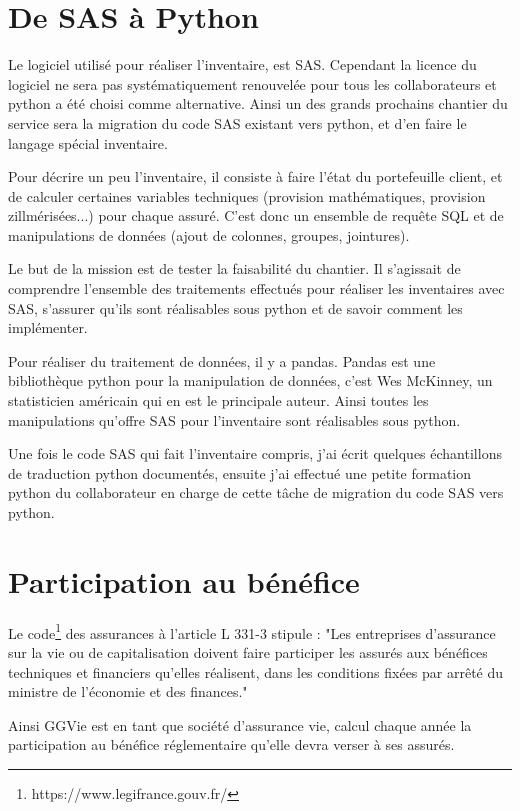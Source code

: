 \chapter{De SAS à Python}

Le logiciel utilisé pour réaliser l'inventaire, est SAS. Cependant la licence du logiciel ne sera pas systématiquement renouvelée pour tous les collaborateurs et python a été choisi comme alternative. Ainsi un des grands prochains chantier du service sera la migration du code SAS existant vers python, et d'en faire le langage spécial inventaire.

Pour décrire un peu l'inventaire, il consiste à faire l'état du portefeuille client, et de calculer certaines variables techniques (provision mathématiques, provision zillmérisées...) pour chaque assuré. C'est donc un ensemble de requête SQL et de manipulations de données (ajout de colonnes, groupes, jointures).

Le but de la mission est de tester la faisabilité du chantier. Il s’agissait de comprendre l’ensemble des traitements effectués pour réaliser les inventaires avec SAS, s'assurer qu'ils sont réalisables sous python et de savoir comment les implémenter. 

Pour réaliser du traitement de données, il y a pandas. Pandas est une bibliothèque python pour la manipulation de données, c'est Wes McKinney, un statisticien américain qui en est le principale auteur. Ainsi toutes les manipulations qu'offre SAS pour l'inventaire sont réalisables sous python.

Une fois le code SAS qui fait l'inventaire compris, j'ai écrit quelques échantillons de traduction python documentés, ensuite j'ai effectué une petite formation python du collaborateur en charge de cette tâche de migration du code SAS vers python.

\chapter{Participation au bénéfice}

Le code\footnote{https://www.legifrance.gouv.fr/} des assurances à l'article L 331-3 stipule :
"Les entreprises d'assurance sur la vie ou de capitalisation doivent faire participer les assurés aux bénéfices techniques et financiers qu'elles réalisent, dans les conditions fixées par arrêté du ministre de l'économie et des finances."

Ainsi GGVie est en tant que société d'assurance vie, calcul chaque année la participation au bénéfice réglementaire qu'elle devra verser à ses assurés. 

